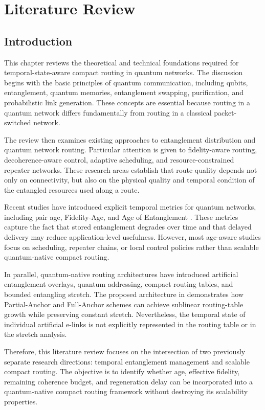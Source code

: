 \chapter{Literature Review}

\section{Introduction}

This chapter reviews the theoretical and technical foundations required for temporal-state-aware compact routing in quantum networks. The discussion begins with the basic principles of quantum communication, including qubits, entanglement, quantum memories, entanglement swapping, purification, and probabilistic link generation. These concepts are essential because routing in a quantum network differs fundamentally from routing in a classical packet-switched network.

The review then examines existing approaches to entanglement distribution and quantum network routing. Particular attention is given to fidelity-aware routing, decoherence-aware control, adaptive scheduling, and resource-constrained repeater networks. These research areas establish that route quality depends not only on connectivity, but also on the physical quality and temporal condition of the entangled resources used along a route.

Recent studies have introduced explicit temporal metrics for quantum networks, including pair age, Fidelity-Age, and Age of Entanglement \cite{ercetin2026fidelityage,ceran2026age}. These metrics capture the fact that stored entanglement degrades over time and that delayed delivery may reduce application-level usefulness. However, most age-aware studies focus on scheduling, repeater chains, or local control policies rather than scalable quantum-native compact routing.

In parallel, quantum-native routing architectures have introduced artificial entanglement overlays, quantum addressing, compact routing tables, and bounded entangling stretch. The proposed architecture in \cite{caleffi2025quantumarchitecture} demonstrates how Partial-Anchor and Full-Anchor schemes can achieve sublinear routing-table growth while preserving constant stretch. Nevertheless, the temporal state of individual artificial e-links is not explicitly represented in the routing table or in the stretch analysis.

Therefore, this literature review focuses on the intersection of two previously separate research directions: temporal entanglement management and scalable compact routing. The objective is to identify whether age, effective fidelity, remaining coherence budget, and regeneration delay can be incorporated into a quantum-native compact routing framework without destroying its scalability properties.

